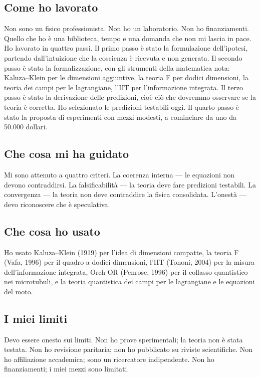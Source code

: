 \documentclass[11pt,a4paper]{article}
\begin{document}
\subsection{Come ho lavorato}
Non sono un fisico professionista. Non ho un laboratorio. Non ho finanziamenti. Quello che ho è una biblioteca, tempo e una domanda che non mi lascia in pace. Ho lavorato in quattro passi. Il primo passo è stato la formulazione dell'ipotesi, partendo dall'intuizione che la coscienza è ricevuta e non generata. Il secondo passo è stato la formalizzazione, con gli strumenti della matematica nota: Kaluza--Klein per le dimensioni aggiuntive, la teoria F per dodici dimensioni, la teoria dei campi per le lagrangiane, l'IIT per l'informazione integrata. Il terzo passo è stato la derivazione delle predizioni, cioè ciò che dovremmo osservare se la teoria è corretta. Ho selezionato le predizioni testabili oggi. Il quarto passo è stato la proposta di esperimenti con mezzi modesti, a cominciare da uno da 50.000 dollari.

\subsection{Che cosa mi ha guidato}
Mi sono attenuto a quattro criteri. La coerenza interna --- le equazioni non devono contraddirsi. La falsificabilità --- la teoria deve fare predizioni testabili. La convergenza --- la teoria non deve contraddire la fisica consolidata. L'onestà --- devo riconoscere che è speculativa.

\subsection{Che cosa ho usato}
Ho usato Kaluza--Klein (1919) per l'idea di dimensioni compatte, la teoria F (Vafa, 1996) per il quadro a dodici dimensioni, l'IIT (Tononi, 2004) per la misura dell'informazione integrata, Orch OR (Penrose, 1996) per il collasso quantistico nei microtubuli, e la teoria quantistica dei campi per le lagrangiane e le equazioni del moto.

\subsection{I miei limiti}
Devo essere onesto sui limiti. Non ho prove sperimentali; la teoria non è stata testata. Non ho revisione paritaria; non ho pubblicato su riviste scientifiche. Non ho affiliazione accademica; sono un ricercatore indipendente. Non ho finanziamenti; i miei mezzi sono limitati.
\end{document}
